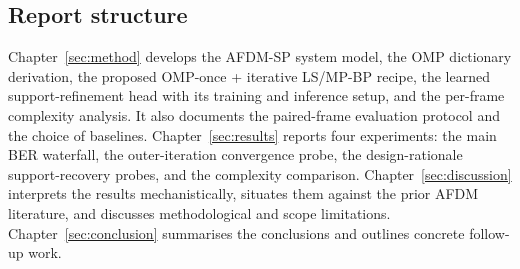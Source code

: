\subsection{Report structure}
\label{ssec:structure}

Chapter~\ref{sec:method} develops the AFDM-SP system model, the OMP
dictionary derivation, the proposed OMP-once + iterative LS/MP-BP recipe, the
learned support-refinement head with its training and inference setup, and
the per-frame complexity analysis. It also documents the paired-frame
evaluation protocol and the choice of baselines.
Chapter~\ref{sec:results} reports four experiments: the main BER waterfall,
the outer-iteration convergence probe, the design-rationale support-recovery
probes, and the complexity comparison.
Chapter~\ref{sec:discussion} interprets the results mechanistically, situates
them against the prior AFDM literature, and discusses methodological and
scope limitations.
Chapter~\ref{sec:conclusion} summarises the conclusions and outlines concrete
follow-up work.
